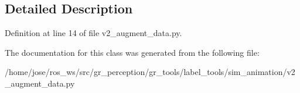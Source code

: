 \subsection{Detailed Description}


Definition at line 14 of file v2\+\_\+augment\+\_\+data.\+py.



The documentation for this class was generated from the following file\+:\begin{DoxyCompactItemize}
\item 
/home/jose/ros\+\_\+ws/src/gr\+\_\+perception/gr\+\_\+tools/label\+\_\+tools/sim\+\_\+animation/v2\+\_\+augment\+\_\+data.\+py\end{DoxyCompactItemize}
